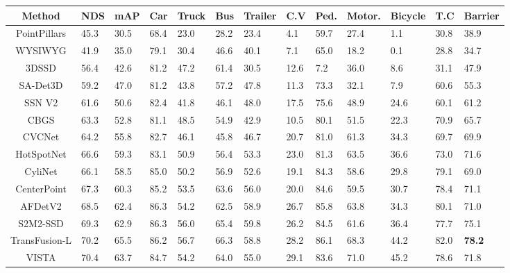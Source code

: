 \documentclass[letterpaper]{article} \usepackage{aaai23}  \usepackage{times}  \usepackage{helvet}  \usepackage{courier}  \usepackage[hyphens]{url}  \usepackage{graphicx} \urlstyle{rm} \def\UrlFont{\rm}  \usepackage{natbib}  \usepackage{caption} \frenchspacing  \setlength{\pdfpagewidth}{8.5in} \usepackage{algorithm}
\begin{document}

\renewcommand{\arraystretch}{1.0}

\begin{table*}[t]
\begin{center}

\begin{adjustbox}{width=0.99\linewidth}

\begin{tabular}{c || C  C |  C  C  C  C  C  C  C  C  C  C }
\Xhline{4\arrayrulewidth}

Method & NDS & mAP & Car & Truck
& Bus & Trailer & C.V & Ped. & Motor. & Bicycle & T.C & Barrier \\ \hline\hline

PointPillars \cite{pointpillars} & 45.3 & 30.5 & 68.4 & 23.0 & 28.2 & 23.4 & 4.1 & 59.7 & 27.4 & 1.1 & 30.8 & 38.9\\
WYSIWYG \cite{wysiwyg} & 41.9 & 35.0 & 79.1 & 30.4 & 46.6 & 40.1 & 7.1 & 65.0 & 18.2 & 0.1 & 28.8 & 34.7\\
3DSSD \cite{3dssd} & 56.4 & 42.6 & 81.2 & 47.2 & 61.4 & 30.5 & 12.6 & 7.2 & 36.0 & 8.6 & 31.1 & 47.9\\
SA-Det3D \cite{sa-det3d} & 59.2 & 47.0 & 81.2 & 43.8 & 57.2 & 47.8 & 11.3 & 73.3 & 32.1 & 7.9 & 60.6 & 55.3\\
SSN V2 \cite{ssnV2} & 61.6 & 50.6 & 82.4 & 41.8 & 46.1 & 48.0 & 17.5 & 75.6 & 48.9 & 24.6 & 60.1 & 61.2\\
CBGS \cite{cbgs} & 63.3 & 52.8 & 81.1 & 48.5 & 54.9 & 42.9 & 10.5 & 80.1 & 51.5 & 22.3 & 70.9 & 65.7\\
CVCNet \cite{cvcnet} & 64.2 & 55.8 & 82.7 & 46.1 & 45.8 & 46.7 & 20.7 & 81.0 & 61.3 & 34.3 & 69.7 & 69.9\\
HotSpotNet \cite{hotspotnet} & 66.6 & 59.3 & 83.1 & 50.9 & 56.4 & 53.3 & 23.0 & 81.3 & 63.5 & 36.6 & 73.0 & 71.6\\
CyliNet \cite{cylinet} & 66.1 & 58.5 & 85.0 & 50.2 & 56.9 & 52.6 & 19.1 & 84.3 & 58.6 & 29.8 & 79.1 & 69.0\\
CenterPoint \cite{centerpoint} & 67.3 & 60.3 & 85.2 & 53.5 & 63.6 & 56.0 & 20.0 & 84.6 & 59.5 & 30.7 & 78.4 & 71.1\\
AFDetV2 \cite{afdetv2} & 68.5 & 62.4 & 86.3 & 54.2 & 62.5 & 58.9 & 26.7 & 85.8 & 63.8 & 34.3 & 80.1 & 71.0 \\
S2M2-SSD \cite{s2m2ssd} & 69.3 & 62.9 & 86.3 & 56.0 & 65.4 & 59.8 & 26.2 & 84.5 & 61.6 & 36.4 & 77.7 & 75.1\\
TransFusion-L \cite{transfusion} & 70.2 & 65.5 & 86.2 & 56.7 & 66.3 & 58.8 & 28.2 & 86.1 & 68.3 & 44.2 & 82.0 & \textbf{78.2}\\
VISTA \cite{vista} & 70.4 & 63.7 & 84.7 & 54.2 & 64.0 & 55.0 & 29.1 & 83.6 & 71.0 & 45.2 & 78.6 & 71.8\\


\end{tabular}
\end{adjustbox}
\end{center}
\end{table*}
\end{document}
